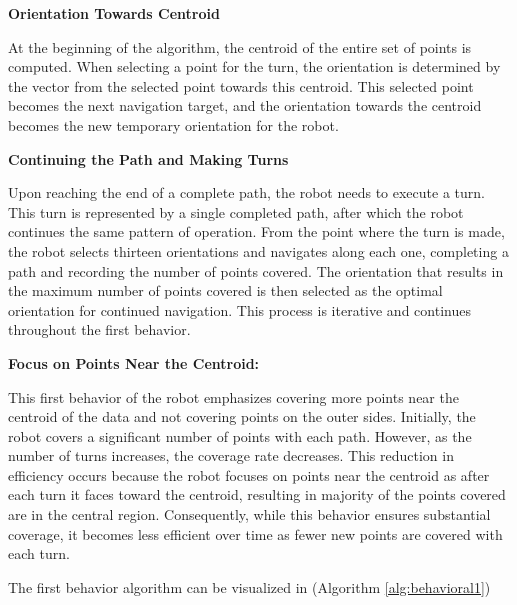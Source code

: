 \textbf{Orientation Towards Centroid}

At the beginning of the algorithm, the centroid of the entire set of points is computed. When selecting a point for the turn, the orientation is determined by the vector from the selected point towards this centroid. This selected point becomes the next navigation target, and the orientation towards the centroid becomes the new temporary orientation for the robot.

\vspace{3mm}  

\textbf{Continuing the Path and Making Turns}

Upon reaching the end of a complete path, the robot needs to execute a turn. This turn is represented by a single completed path, after which the robot continues the same pattern of operation. From the point where the turn is made, the robot selects thirteen orientations and navigates along each one, completing a path and recording the number of points covered. The orientation that results in the maximum number of points covered is then selected as the optimal orientation for continued navigation. This process is iterative and continues throughout the first behavior.

\vspace{3mm}  

\textbf{Focus on Points Near the Centroid:}

This first behavior of the robot emphasizes covering more points near the centroid of the data and not covering points on the outer sides. Initially, the robot covers a significant number of points with each path. However, as the number of turns increases, the coverage rate decreases. This reduction in efficiency occurs because the robot focuses on points near the centroid as after each turn it faces toward the centroid, resulting in majority of the points covered are in the central region. Consequently, while this behavior ensures substantial coverage, it becomes less efficient over time as fewer new points are covered with each turn.

\vspace{3mm}  


The first behavior algorithm can be visualized in (Algorithm \autoref{alg:behavioral1})

\vspace{3mm}  

